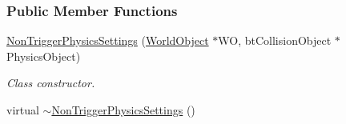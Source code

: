 \subsubsection*{Public Member Functions}
\begin{DoxyCompactItemize}
\item 
\hyperlink{classMezzanine_1_1NonTriggerPhysicsSettings_aaeda1ca7117e33be5c285e59f4d78cba}{NonTriggerPhysicsSettings} (\hyperlink{classMezzanine_1_1WorldObject}{WorldObject} $\ast$WO, btCollisionObject $\ast$PhysicsObject)
\begin{DoxyCompactList}\small\item\em Class constructor. \item\end{DoxyCompactList}\item 
\hypertarget{classMezzanine_1_1NonTriggerPhysicsSettings_a7c32afaa05f2f971533659ddca2f95b4}{
virtual \hyperlink{classMezzanine_1_1NonTriggerPhysicsSettings_a7c32afaa05f2f971533659ddca2f95b4}{$\sim$NonTriggerPhysicsSettings} ()}
\label{classMezzanine_1_1NonTriggerPhysicsSettings_a7c32afaa05f2f971533659ddca2f95b4}


\end{DoxyCompactItemize}
